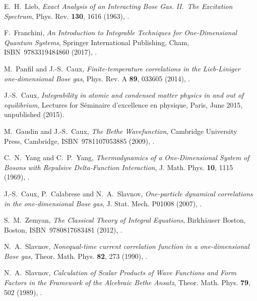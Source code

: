 \documentclass[11pt, a4paper]{report} %
\begin{document}
\begin{thebibliography}{99}
E.~H.~Lieb, \textit{Exact Analysis of an Interacting Bose Gas. II.\ The Excitation Spectrum}, Phys. Rev. \textbf{130}, 1616 (1963), .




F.~Franchini, \textit{An Introduction to Integrable Techniques for One-Dimensional Quantum Systems}, Springer International Publishing, Cham, ISBN~9783319484860 (2017), .




M.~Panfil and J.-S.~Caux, \textit{Finite-temperature correlations in the Lieb-Liniger one-dimensional Bose gas}, Phys. Rev. A \textbf{89}, 033605 (2014), .




J.-S.~Caux, \emph{Integrability in atomic and condensed matter physics in and out of equilibrium}, Lectures for S{\'e}minaire d'excellence en physique, Paris, June 2015, unpublished (2015).



M.~Gaudin and J.-S.~Caux, \textit{The Bethe Wavefunction}, Cambridge University Press, Cambridge, ISBN~9781107053885 (2009), .




C.~N.~Yang and C.~P.~Yang, \textit{Thermodynamics of a One‐Dimensional System of Bosons with Repulsive Delta‐Function Interaction}, J. Math. Phys. \textbf{10}, 1115 (1969), .




J.-S.~Caux, P.~Calabrese and N.~A.~Slavnov, \textit{One-particle dynamical correlations in the one-dimensional Bose gas}, J. Stat. Mech. P01008 (2007), .




S.~M.~Zemyan, \textit{The Classical Theory of Integral Equations}, Birkhäuser Boston, Boston, ISBN~9780817683481 (2012), .






N.~A.~Slavnov, \textit{Nonequal-time current correlation function in a one-dimensional Bose gas}, Theor. Math. Phys. \textbf{82}, 273 (1990), .

N.~A.~Slavnov, \textit{Calculation of Scalar Products of Wave Functions and Form Factors in the Framework of the Alcebraic Bethe Ansatz}, Theor. Math. Phys. \textbf{79}, 502 (1989), .



\end{thebibliography}
\end{document}

